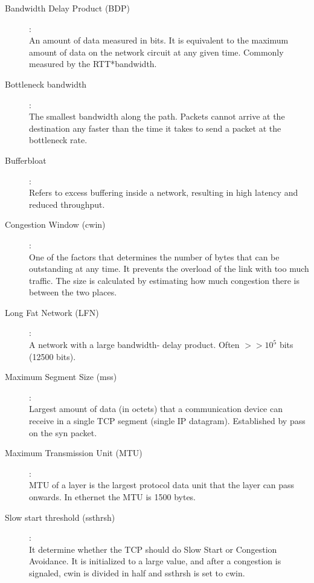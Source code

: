 \begin{description}

\item [Bandwidth Delay Product (BDP)]:\hfill \\  An amount of data measured in
bits. It is equivalent to the maximum amount of data on the network circuit at
any given time. Commonly measured by the RTT*bandwidth.

\item[Bottleneck bandwidth]: \hfill \\  The smallest bandwidth along the path.
Packets cannot arrive at the destination any faster than the time it takes to
send a packet at the bottleneck rate.

\item [Bufferbloat]:\hfill \\  Refers to excess buffering inside a network,
resulting in high latency and reduced throughput.

\item [Congestion Window (cwin)]: \hfill \\  One of the factors that
determines the number of bytes that can be outstanding at any time. It
prevents the overload of the link with too much traffic. The size is
calculated by estimating how much congestion there is between the two places.

\item [Long Fat Network (LFN)]:\hfill \\ A network with a large bandwidth-
delay product. Often $>> 10^5$ bits (12500 bits). 

\item [Maximum Segment Size (mss)]: \hfill \\  Largest amount of data (in
octets) that a communication device can receive in a single TCP segment
(single IP datagram). Established by pass on the syn packet.

\item [Maximum Transmission Unit (MTU)]:\hfill \\  MTU of a
layer is the largest protocol data unit that the layer can pass onwards. In
ethernet the MTU is 1500 bytes.

\item [Slow start threshold (ssthrsh)]: \hfill \\  It determine whether the
TCP should do Slow Start or Congestion Avoidance. It is initialized to a large
value, and after a congestion is signaled, cwin is divided in half and ssthrsh
is set to cwin.


\end{description}
